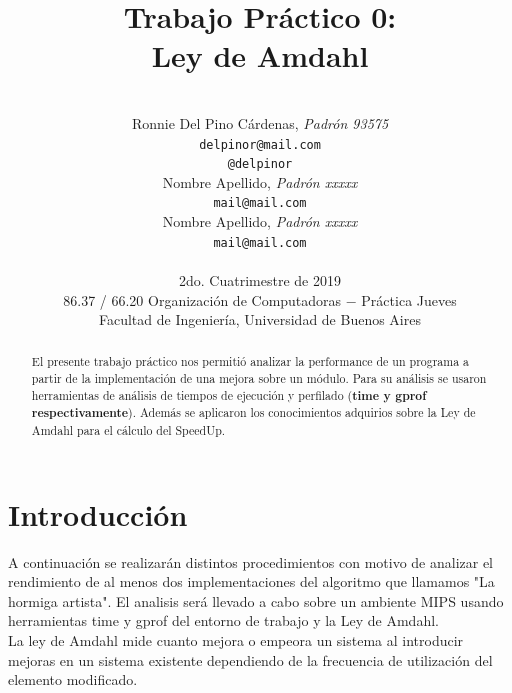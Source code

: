 \documentclass[a4paper, 10pt, twoside, notitlepage]{article}
\title{\textbf{Trabajo Práctico 0:\\Ley de Amdahl} \\}
\author{ \\
         Ronnie Del Pino Cárdenas, \textit{Padrón 93575} \\
          \texttt{ delpinor@mail.com }       \\
          \texttt{ @delpinor }       \\
		  [2.5ex]
         Nombre Apellido, \textit{Padrón xxxxx}     \\
          \texttt{mail@mail.com}                      \\ 
		  [2.5ex]
		  Nombre Apellido, \textit{Padrón xxxxx}     \\
          \texttt{mail@mail.com}                      \\ 
		  [2.5ex]
		 \\
         \normalsize{2do. Cuatrimestre de 2019}            \\
         \normalsize{86.37 / 66.20 Organización de Computadoras $-$ Práctica Jueves} \\
         \normalsize{Facultad de Ingeniería, Universidad de Buenos Aires} 
       }
\date{}
\begin{document}
\maketitle

\begin{abstract}
El presente trabajo práctico nos permitió analizar la performance de un programa a partir de la implementación de una mejora sobre un módulo. Para su análisis se usaron herramientas de análisis de tiempos de ejecución y perfilado (\textbf{time  y gprof respectivamente}). Además se aplicaron los conocimientos adquirios sobre la Ley de Amdahl para el cálculo del SpeedUp.
\end{abstract}

% 
% 

\pagestyle{fancy}
\fancyhead{}
\fancyfoot{}
\renewcommand{\sectionmark}[1]{\markright{\thesection\ #1}}
\renewcommand{\headrulewidth}{0.4pt}
\fancyhead[LE]{\nouppercase \rightmark}
\fancyhead[RE, LO]{\bf \thepage}
\fancyhead[RO]{\nouppercase \rightmark}
\fancyfoot[C]{ }
\maketitle
\setcounter{page}{1}

\parskip 7.2pt
\section{Introducción}
A continuación se realizarán distintos procedimientos con motivo de  analizar el rendimiento de al menos dos implementaciones del algoritmo que llamamos "La hormiga artista". El analisis será llevado a cabo sobre un ambiente MIPS usando herramientas time y gprof del entorno de trabajo y la Ley de Amdahl.\\

La ley de Amdahl mide cuanto mejora o empeora un sistema al introducir mejoras en un sistema existente dependiendo de la frecuencia de utilización del elemento modificado.\\
\end{document}
